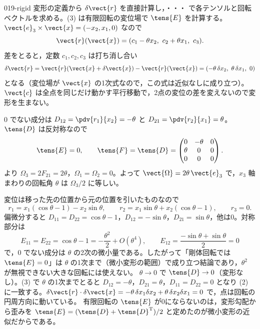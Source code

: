 \documentclass[uplatex,dvipdfmx,a4paper,11pt]{jsarticle}
\begin{document}
\kaitouhen
{}
\begin{kaisetsu}{019-rigid}
\houshin 変形の定義から $\delta\vect{r}$ を直接計算し，・・・ で各テンソルと回転ベクトルを求める。(3) は有限回転の変位場で $\tens{E}$ を計算する。
\keisan {} $\vect{e}_3\times\vect{x}=(-x_2,x_1,0)$ なので
\[ \vect{r}(\vect{x})=(c_1-\theta x_2,\ c_2+\theta x_1,\ c_3). \]
差をとると，定数 $c_1,c_2,c_3$ は打ち消し合い
\[ \delta\vect{r}=\vect{r}(\vect{x}+\delta\vect{x})-\vect{r}(\vect{x})=(-\theta\,\delta x_2,\ \theta\,\delta x_1,\ 0) \]
となる（変位場が $\vect{x}$ の1次式なので，この式は近似なしに成り立つ）。$\vect{c}$ は全点を同じだけ動かす平行移動で，2点の変位の差を変えないので変形を生まない。

 0 でない成分は $D_{12}=\pdv{r_1}{x_2}=-\theta$ と $D_{21}=\pdv{r_2}{x_1}=\theta$。$\tens{D}$ は反対称なので
\[ \tens{E}=0,\qquad \tens{F}=\tens{D}=\begin{pmatrix} 0 & -\theta & 0\\ \theta & 0 & 0\\ 0 & 0 & 0 \end{pmatrix}. \]
 より $\Omega_3=2F_{21}=2\theta$，$\Omega_1=\Omega_2=0$。よって $\vect{\Omega}=2\theta\,\vect{e}_3$ で，$x_3$ 軸まわりの回転角 $\theta$ は $\Omega_3/2$ に等しい。

 変位は移った先の位置から元の位置を引いたものなので
\[ r_1=x_1(\cos\theta-1)-x_2\sin\theta,\qquad r_2=x_1\sin\theta+x_2(\cos\theta-1),\qquad r_3=0. \]
偏微分すると $D_{11}=D_{22}=\cos\theta-1$，$D_{12}=-\sin\theta$，$D_{21}=\sin\theta$，他は0。対称部分は
\[ E_{11}=E_{22}=\cos\theta-1=-\frac{\theta^{2}}{2}+O(\theta^{4}),\qquad E_{12}=\frac{-\sin\theta+\sin\theta}{2}=0 \]
で，0 でない成分は $\theta$ の2次の微小量である。したがって「剛体回転では $\tens{E}=0$」は $\theta$ の1次まで（微小変形の範囲）で成り立つ結論であり，$\theta^{2}$ が無視できない大きな回転には使えない。
\kenzan $\theta\to0$ で $\tens{D}\to0$（変形なし）。(3) で $\theta$ の1次までとると $D_{12}=-\theta$，$D_{21}=\theta$，$D_{11}=D_{22}=0$ となり (2) に一致する。$\delta\vect{r}\cdot\delta\vect{x}=-\theta\,\delta x_1\delta x_2+\theta\,\delta x_2\delta x_1=0$ で，点は回転の円周方向に動いている。
\tsumazuki 有限回転の $\tens{E}$ が0にならないのは，変形勾配から歪みを $\tens{E}=(\tens{D}+\tens{D}^{\mathrm{T}})/2$ と定めたのが微小変形の近似だからである。
\end{kaisetsu}
\end{document}
